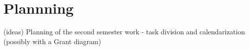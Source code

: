 \chapter{Plannning}
\label{chapter:planning}

{\color{red}
(ideas) Planning of the second semester work - task division and calendarization (possibly with a Grant diagram)
}